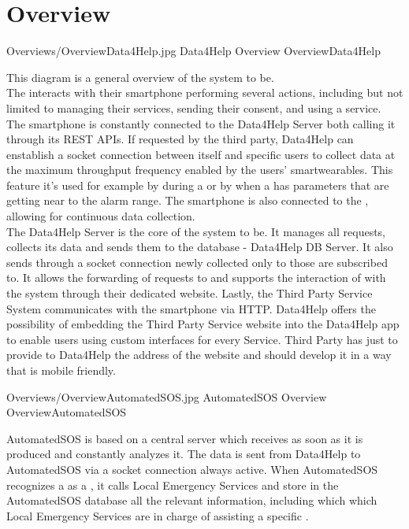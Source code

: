 \documentclass[../../DD.tex]{subfiles}
\begin{document}
\section{Overview \label{sect:2.1}}

	\image {13cm} {Overviews/OverviewData4Help.jpg} {Data4Help Overview} {OverviewData4Help}

	This diagram is a general overview of the system to be.\\
	The  interacts with their smartphone performing several actions, including but not limited to managing their services, sending their consent, and using a service. The smartphone is constantly connected to the Data4Help Server both calling it through its REST APIs. If requested by the third party, Data4Help can enstablish a socket connection between itself and specific users to collect data at the maximum throughput frequency enabled by the users' smartwearables. This feature it's used for example by  during a  or by  when a  has parameters that are getting near to the alarm range. The smartphone is also connected to the , allowing for continuous data collection.\\
\indent The Data4Help Server is the core of the system to be. It manages all  requests, collects its data and sends them to the database - Data4Help DB Server. It also sends through a socket connection newly collected  only to those  are subscribed to. It allows the forwarding of  requests to  and supports the interaction of  with the system through their dedicated website.
\indent Lastly, the Third Party Service System communicates with the  smartphone via HTTP. Data4Help offers the possibility of embedding the Third Party Service website into the Data4Help app to enable users using custom interfaces for every Service. Third Party has just to provide to Data4Help the address of the website and should develop it in a way that is mobile friendly.



	\image {13cm} {Overviews/OverviewAutomatedSOS.jpg} {AutomatedSOS Overview} {OverviewAutomatedSOS}

	AutomatedSOS is based on a central server which receives  as soon as it is produced and constantly analyzes it. The data is sent from Data4Help to AutomatedSOS via a socket connection always active. When AutomatedSOS recognizes a  as a , it calls Local Emergency Services and store in the AutomatedSOS database all the relevant information, including which which Local Emergency Services are in charge of assisting a specific .
\end{document}
